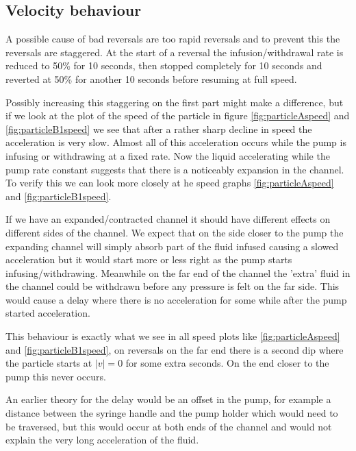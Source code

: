 \subsection{Velocity behaviour}
A possible cause of bad reversals are too rapid reversals and to prevent this the reversals are staggered. At the start of a reversal the infusion/withdrawal rate is reduced to 50\% for 10 seconds, then stopped completely for 10 seconds and reverted at 50\% for another 10 seconds before resuming at full speed.

Possibly increasing this staggering on the first part might make a difference, but if we look at the plot of the 
speed of the particle in figure \ref{fig:particleAspeed} and \ref{fig:particleB1speed} we see that after a rather 
sharp decline in speed the acceleration is very slow. Almost all of this acceleration occurs while the pump is 
infusing or withdrawing at a fixed rate. Now the liquid accelerating while the pump rate constant suggests that there 
is a noticeably expansion in the channel. To verify this we can look more closely at he speed graphs 
\ref{fig:particleAspeed} and \ref{fig:particleB1speed}.

If we have an expanded/contracted channel it should have different effects on different sides of the channel. We 
expect that on the side closer to the pump the expanding channel will simply absorb part of the fluid infused causing 
a slowed acceleration but it would start more or less right as the pump starts infusing/withdrawing. Meanwhile on the 
far end of the channel the 'extra' fluid in the channel could be withdrawn before any pressure is felt on the far 
side. This would cause a delay where there is no acceleration for some while after the pump started acceleration. 

This behaviour is exactly what we see in all speed plots like \ref{fig:particleAspeed} and \ref{fig:particleB1speed}, 
on reversals on the far end there is a second dip where the particle starts at $\left|v\right|=0$ for some extra 
seconds. On the end closer to the pump this never occurs. 

An earlier theory for the delay would be an offset in the pump, for example a distance between the syringe handle and the pump holder which would need to be traversed, but this would occur at both ends of the channel and would not explain the very long acceleration of the fluid. 

